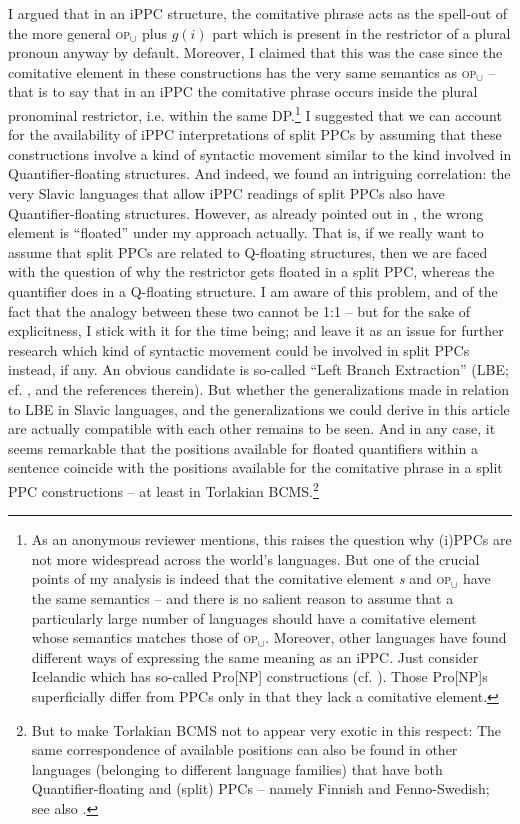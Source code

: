 \documentclass[output=paper,colorlinks,citecolor=brown]{langscibook}
\begin{document}
I argued that in an iPPC structure, the comitative phrase acts as the spell-out of the more general \textsc{op}$_\cup$ plus $g(i)$ part which is present in the restrictor of a plural pronoun anyway by default. Moreover, I claimed that this was the case since the comitative element in these constructions has the very same semantics as \textsc{op}$_\cup$ -- that is to say that in an iPPC the comitative phrase occurs inside the plural pronominal restrictor, i.e. within the same DP.\footnote{As an anonymous reviewer mentions, this raises the question why (i)PPCs are not more widespread across the world's languages. But one of the crucial points of my analysis is indeed that the comitative element \textit{s} and \textsc{op}$_\cup$ have the same semantics -- and there is no salient reason to assume that a particularly large number of languages should have a comitative element whose semantics matches those of \textsc{op}$_\cup$. Moreover, other languages have found different ways of expressing the same meaning as an iPPC. Just consider Icelandic which has so-called Pro[NP] constructions (cf. \cite{SigurdssonWood2021}). Those Pro[NP]s superficially differ from PPCs only in that they lack a comitative element.} I suggested that we can account for the availability of iPPC interpretations of split PPCs by assuming that these constructions involve a kind of syntactic movement similar to the kind involved in Quantifier-floating structures. And indeed, we found an intriguing correlation: the very Slavic languages that allow iPPC readings of split PPCs also have Quantifier-floating structures. However, as already pointed out in , the wrong element is ``floated'' under my approach actually. That is, if we really want to assume that split PPCs are related to Q-floating structures, then we are faced with the question of why the restrictor gets floated in a split PPC, whereas the quantifier does in a Q-floating structure. I am aware of this problem, and of the fact that the analogy between these two cannot be 1:1 -- but for the sake of explicitness, I stick with it for the time being; and leave it as an issue for further research which kind of syntactic movement could be involved in split PPCs instead, if any. An obvious candidate is so-called ``Left Branch Extraction'' (LBE; cf. \cite{Boskovic2008}, and the references therein). But whether the generalizations made in relation to LBE in Slavic languages, and the generalizations we could derive in this article are actually compatible with each other remains to be seen. And in any case, it seems remarkable that the positions available for floated quantifiers within a sentence coincide with the positions available for the comitative phrase in a split PPC constructions -- at least in Torlakian BCMS.\footnote{But to make Torlakian BCMS not to appear very exotic in this respect: The same correspondence of available positions can also be found in other languages (belonging to different language families) that have both Quantifier-floating and (split) PPCs -- namely Finnish and Fenno-Swedish; see also \citet{Butschety2023}.}
\end{document}
